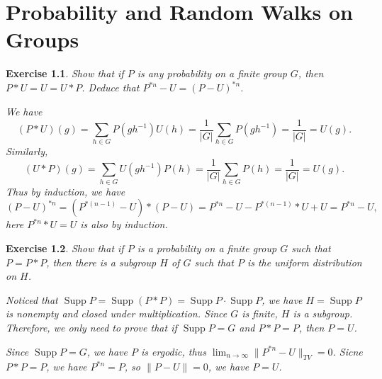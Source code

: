 \documentclass[11pt]{report}
\theoremstyle{mythm}
\let\oldendproof\endproof
\renewenvironment{proof}[1][\proofname]{%
  \oldproof[\normalfont \bfseries #1]%
}{\oldendproof}
\newtheorem{exercise}{Exercise}[chapter]
\renewcommand*{\proofname}{Proof}
\theoremstyle{myans}
\DeclareMathOperator{\Supp}{Supp}
\newcommand{\norm}[1]{\| #1 \|}
\begin{document}
\setcounter{chapter}{10}
\chapter{Probability and Random Walks on Groups}

\begin{exercise}
  Show that if $P$ is any probability on a finite group $G$, then $P*U=
  U = U * P$. Deduce that $P^{*n} - U = (P - U)^{*n}$.
  \begin{proof}
    We have
    \[ (P*U)(g) = \sum_{h\in G} P(gh^{-1})U(h)
    = \frac 1{|G|} \sum_{h\in G} P(gh^{-1}) = \frac 1{|G|} = U(g). \]
    Similarly,
    \[ (U*P)(g) = \sum_{h\in G} U(gh^{-1})P(h)
    = \frac 1{|G|} \sum_{h\in G} P(h) = \frac 1{|G|} = U(g). \]
    Thus by induction, we have
    \[ (P-U)^{*n} = (P^{*(n-1)} - U)*(P-U)
    = P^{*n} - U - P^{*(n-1)}*U + U
    = P^{*n} - U, \]
    here $P^{*n}*U = U$ is also by induction.
  \end{proof}
\end{exercise}

\begin{exercise}
  Show that if $P$ is a probability on a finite group $G$ such that $P =
  P * P$, then there is a subgroup $H$ of $G$ such that $P$ is the uniform
  distribution on $H$.
  \begin{proof}
    Noticed that $\Supp P = \Supp(P*P) = \Supp P \cdot \Supp P$,
    we have $H=\Supp P$ is nonempty and closed under multiplication.
    Since $G$ is finite, $H$ is a subgroup. Therefore, we only need to prove
    that if $\Supp P = G$ and $P*P = P$, then $P = U$.

    Since $\Supp P = G$, we have $P$ is ergodic, thus
    $\lim_{n\to \infty} \norm{P^{*n} - U}_{TV} = 0$.
    Sicne $P*P=P$, we have $P^{*n} = P$, so
    $\norm{P-U} = 0$, we have $P = U$.
  \end{proof}
\end{exercise}
\end{document}
